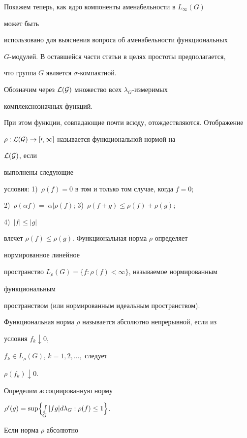 Покажем теперь, как ядро компоненты аменабельности в $L_\infty(G)$


может быть


использовано для выяснения вопроса об аменабельности функциональных


$G$-модулей. В оставшейся части статьи в целях простоты предполагается,


что группа $G$ является $\sigma$-компактной.





Обозначим через $\cal L(G)$ множество всех $\lambda_G$-измеримых


комплекснозначных функций.


При этом функции, совпадающие почти всюду, отождествляются. Отображение


$\rho:\cal L(G)\to[0,\infty]$ называется функциональной нормой на


$\cal L(G)$, если


выполнены следующие


условия: 1)~$\rho(f)=0$ в том и только том случае, когда $f=0$;


2)~$\rho(\alpha f)=|\alpha|\rho(f)$; 3)~$\rho(f+g)\le\rho(f)+\rho(g)$;


4)~$|f|\le |g|$


влечет $\rho(f)\le\rho(g)$. Функциональная норма $\rho$ определяет


нормированное линейное


пространство $L_\rho(G)=\{f:\rho(f)<\infty\}$, называемое нормированным


функциональным


пространством (или нормированным идеальным пространством).





Функциональная норма $\rho$ называется абсолютно непрерывной, если из


условия $f_k\downarrow 0$,\linebreak


$f_k\in L_\rho(G)$, $k=1,2,\dotsc,$ следует


$\rho(f_k)\downarrow 0$.





Определим ассоциированную норму


$\rho'(g)=\sup\Bigl\{\int\limits_G|fg|d\lambda_G:\rho(f)\le 1\Bigr\}$.


Если норма $\rho$ абсолютно


